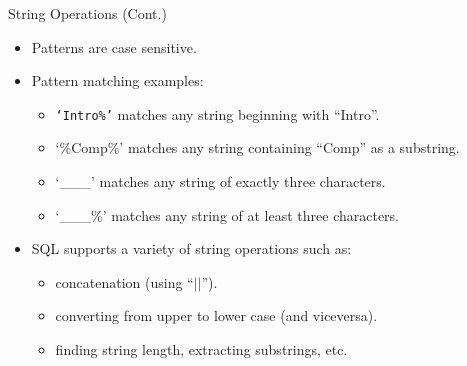 \documentclass[aspectratio=169]{beamer}
\begin{document}

\begin{frame}[fragile]{String Operations (Cont.)}
    \begin{itemize}
        \item Patterns are case sensitive.
        \item Pattern matching examples:
        \begin{itemize}
            \item \texttt{`Intro\%'} matches any string beginning with ``Intro''.
            \item `\%Comp\%' matches any string containing ``Comp'' as a substring.
            \item `\_\_\_' matches any string of exactly three characters.
            \item `\_\_\_\%' matches any string of at least three characters.
        \end{itemize}
        \item SQL supports a variety of string operations such as:
        \begin{itemize}
            \item concatenation (using ``$| |$'').
            \item converting from upper to lower case (and viceversa).
            \item finding string length, extracting substrings, etc.
        \end{itemize}
    \end{itemize}
\end{frame}
\end{document}
